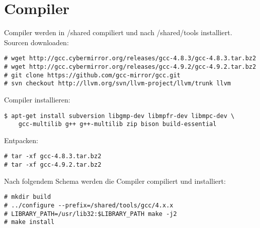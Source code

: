 \chapter{Compiler}
Compiler werden in /shared compiliert und nach /shared/tools installiert.
Sourcen downloaden:
\begin{lstlisting}[style=Bash]
# wget http://gcc.cybermirror.org/releases/gcc-4.8.3/gcc-4.8.3.tar.bz2
# wget http://gcc.cybermirror.org/releases/gcc-4.9.2/gcc-4.9.2.tar.bz2
# git clone https://github.com/gcc-mirror/gcc.git
# svn checkout http://llvm.org/svn/llvm-project/llvm/trunk llvm
\end{lstlisting}
Compiler installieren:
\begin{lstlisting}[style=Bash]
$ apt-get install subversion libgmp-dev libmpfr-dev libmpc-dev \
	gcc-multilib g++ g++-multilib zip bison build-essential
\end{lstlisting}
Entpacken:
\begin{lstlisting}[style=Bash]
# tar -xf gcc-4.8.3.tar.bz2
# tar -xf gcc-4.9.2.tar.bz2
\end{lstlisting}
Nach folgendem Schema werden die Compiler compiliert und installiert:
\begin{lstlisting}[style=Bash]
# mkdir build 
# ../configure --prefix=/shared/tools/gcc/4.x.x
# LIBRARY_PATH=/usr/lib32:$LIBRARY_PATH make -j2
# make install
\end{lstlisting}
